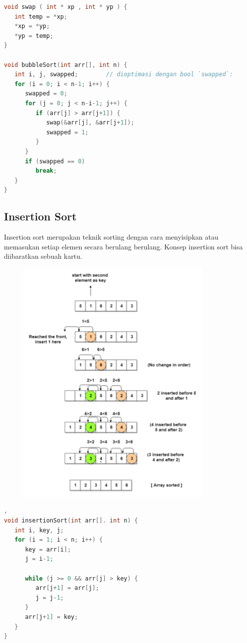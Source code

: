 \begin{lstlisting}[language=c,caption=Implementasi Bubble Sort]
void swap ( int * xp , int * yp ) {
   int temp = *xp;
   *xp = *yp;
   *yp = temp;
}

void bubbleSort(int arr[], int n) {
   int i, j, swapped;        // dioptimasi dengan bool `swapped`:
   for (i = 0; i < n-1; i++) {
      swapped = 0;
      for (j = 0; j < n-i-1; j++) {
         if (arr[j] > arr[j+1]) {
            swap(&arr[j], &arr[j+1]);
            swapped = 1;
         }
      }
      if (swapped == 0)
         break;
   }
}
\end{lstlisting}

\subsection{Insertion Sort}
Insertion sort merupakan teknik sorting dengan cara menyisipkan atau memasukan setiap elemen secara berulang berulang.
Konsep insertion sort bisa diibaratkan sebuah kartu.

\begin{figure}[H]
    \centering
    \includegraphics[width=0.5\linewidth]{P4/img/screenshot007.png}
    \caption{}
    \label{fig:tujuh}
\end{figure}
\begin{lstlisting}[language=c,caption=Implementasi Insertion Sort], 
void insertionSort(int arr[]. int n) {
   int i, key, j;
   for (i = 1; i < n; i++) {
      key = arr[i];
      j = i-1;
    
      while (j >= 0 && arr[j] > key) {
         arr[j+1] = arr[j];
         j = j-1;
      }
      arr[j+1] = key;
   }
}
\end{lstlisting}

